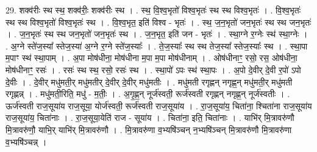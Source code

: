 \documentclass[17pt]{extarticle}
\begin{document}
29. शक्व॑रीः स्थ स्थ॒ शक्व॑रीः॒ शक्व॑रीः स्थ । . स्थ॒ वि॒श्व॒भृतो॑ विश्व॒भृतः॑ स्थ स्थ विश्व॒भृतः॑ । . वि॒श्व॒भृतः॑ स्थ स्थ विश्व॒भृतो॑ विश्व॒भृतः॑ स्थ । . वि॒श्व॒भृत॒ इति॑ विश्व - भृतः॑ । . स्थ॒ ज॒न॒भृतो॑ जन॒भृतः॑ स्थ स्थ जन॒भृतः॑ । . ज॒न॒भृतः॑ स्थ स्थ जन॒भृतो॑ जन॒भृतः॑ स्थ । . ज॒न॒भृत॒ इति॑ जन - भृतः॑ । . स्था॒ग्ने र॒ग्नेः स्थ॑ स्था॒ग्नेः । . अ॒ग्ने स्ते॑ज॒स्या᳚ स्तेज॒स्या॑ अ॒ग्ने र॒ग्ने स्ते॑ज॒स्याः᳚ । . ते॒ज॒स्याः᳚ स्थ स्थ तेज॒स्या᳚ स्तेज॒स्याः᳚ स्थ । . स्था॒पा म॒पाꣳ स्थ॑ स्था॒पाम् । . अ॒पा मोष॑धीना॒ मोष॑धीना म॒पा म॒पा मोष॑धीनाम् । . ओष॑धीनाꣳ॒॒ रसो॒ रस॒ ओष॑धीना॒ मोष॑धीनाꣳ॒॒ रसः॑ । . रसः॑ स्थ स्थ॒ रसो॒ रसः॑ स्थ । . स्था॒पो॑ ऽपः स्थ॑ स्था॒पः । . अ॒पो दे॒वीर् दे॒वी र॒पो॑ ऽपो दे॒वीः । . दे॒वीर् मधु॑मती॒र् मधु॑मतीर् दे॒वीर् दे॒वीर् मधु॑मतीः । . मधु॑मती रगृह्णन् नगृह्ण॒न् मधु॑मती॒र् मधु॑मती रगृह्णन्न् । . मधु॑मती॒रिति॒ मधु॑ - म॒तीः॒ । . अ॒गृ॒ह्ण॒न् नूर्ज॑स्वती॒ रूर्ज॑स्वती रगृह्णन् नगृह्ण॒न् नूर्ज॑स्वतीः । . ऊर्ज॑स्वती राज॒सूया॑य राज॒सूया॒ योर्ज॑स्वती॒ रूर्ज॑स्वती राज॒सूया॑य । . रा॒ज॒सूया॑य॒ चिता॑ना॒ श्चिता॑ना राज॒सूया॑य राज॒सूया॑य॒ चिता॑नाः । . रा॒ज॒सूया॒येति॑ राज - सूया॑य । . चिता॑ना॒ इति॒ चिता॑नाः । . याभि॑र् मि॒त्रावरु॑णौ मि॒त्रावरु॑णौ॒ याभि॒र् याभि॑र् मि॒त्रावरु॑णौ । . मि॒त्रावरु॑णा व॒भ्यषि॑ञ्चन् न॒भ्यषि॑ञ्चन् मि॒त्रावरु॑णौ मि॒त्रावरु॑णा व॒भ्यषि॑ञ्चन्न् । \newline
\end{document}
